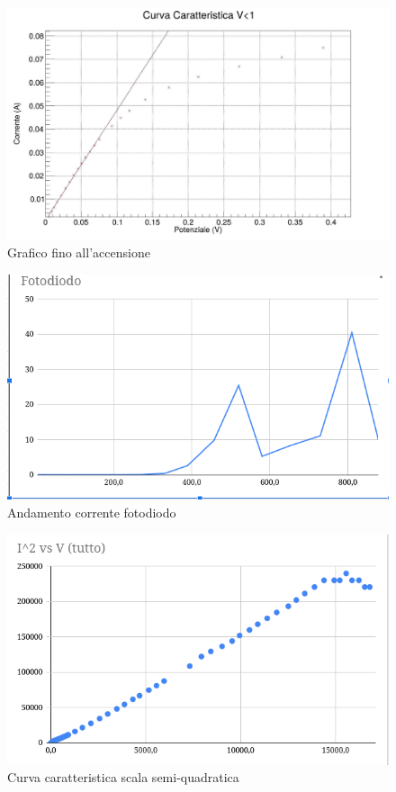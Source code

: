 \documentclass[a4paper]{article}
\begin{document}
\begin{figure}[!htbp]\label{accensione}
      \includegraphics[width=\textwidth]{immagini/graficozoomato1.jpg}
        \caption{Grafico fino all'accensione}
\end{figure}
\FloatBarrier

\begin{figure}[!htbp]
      \includegraphics[width=\textwidth]{immagini/fotodiodografico.png}
        \caption{Andamento corrente fotodiodo}
\end{figure}
\FloatBarrier

\begin{figure}[!htbp]
      \includegraphics[width=\textwidth]{immagini/I2vsV.png}
        \caption{Curva caratteristica scala semi-quadratica}
\end{figure}
\FloatBarrier
\end{document}
